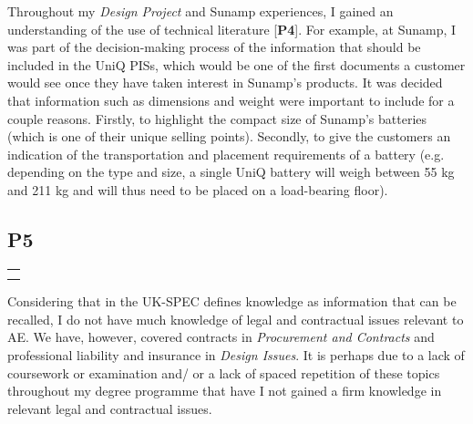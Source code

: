 Throughout my \textit{Design Project} and Sunamp experiences, I gained an understanding of the use of technical literature [\textbf{P4}].
For example, at Sunamp, I was part of the decision-making process of the information that should be included in the UniQ PISs, which would be one of the first documents a customer would see once they have taken interest in Sunamp's products.
It was decided that information such as dimensions and weight were important to include for a couple reasons.
Firstly, to highlight the compact size of Sunamp's batteries (which is one of their unique selling points).
Secondly, to give the customers an indication of the transportation and placement requirements of a battery (e.g. depending on the type and size, a single UniQ battery will weigh between 55 kg and 211 kg 
and will thus need to be placed on a load-bearing floor).


\subsection*{P5}

\begin{table}
	\begin{tabular}{|l|}
		\hline
		\rowcolor[HTML]{F8A102} 
		\multicolumn{1}{|c|}{\cellcolor[HTML]{F8A102}\textbf{P5} \littlemaster} \\ \hline
		\PC \\
		\DI \\ \hline
	\end{tabular}
\end{table}

Considering that in the UK-SPEC defines knowledge as information that can be recalled, I do not have much knowledge of legal and contractual issues relevant to AE.
We have, however, covered contracts in \textit{Procurement and Contracts} and professional liability and insurance in \textit{Design Issues}.
It is perhaps due to a lack of coursework or examination and/ or a lack of spaced repetition of these topics throughout my degree programme that have I not gained a firm knowledge in relevant legal and contractual issues.





